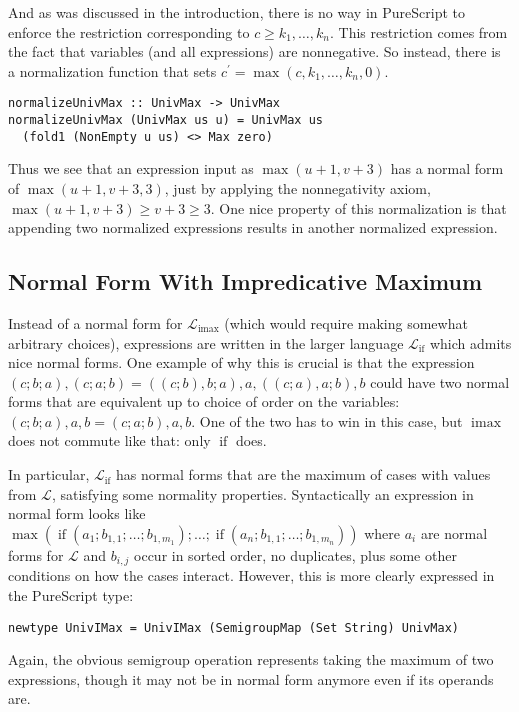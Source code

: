 \documentclass[11pt, twoside, reqno]{book}
\DeclareMathOperator{\imax}{imax}
\DeclareMathOperator{\ifop}{if}
\begin{document}

And as was discussed in the introduction, there is no way in PureScript to enforce the restriction corresponding to \(c \ge k_1, \dots, k_n\).
This restriction comes from the fact that variables (and all expressions) are nonnegative.
So instead, there is a normalization function that sets \(c^\prime = \max(c, k_1, \dots, k_n, 0)\).
\begin{verbatim}
normalizeUnivMax :: UnivMax -> UnivMax
normalizeUnivMax (UnivMax us u) = UnivMax us
  (fold1 (NonEmpty u us) <> Max zero)
\end{verbatim}
Thus we see that an expression input as \(\max(u+1, v+3)\) has a normal form of \(\max(u+1, v+3, 3)\), just by applying the nonnegativity axiom, \(\max(u+1, v+3) \ge v+3 \ge 3\).
One nice property of this normalization is that appending two normalized expressions results in another normalized expression.

\subsection{Normal Form With Impredicative Maximum}

Instead of a normal form for \(\mathcal{L}_{\imax}\) (which would require making somewhat arbitrary choices), expressions are written in the larger language \(\mathcal{L}_{\ifop}\) which admits nice normal forms.
One example of why this is crucial is that the expression \((c; b; a), (c; a; b) = ((c; b), b; a), a, ((c; a), a; b), b\) could have two normal forms that are equivalent up to choice of order on the variables: \((c; b; a), a, b = (c; a; b), a, b\).
One of the two has to win in this case, but \(\imax\) does not commute like that: only \(\ifop\) does.

In particular, \(\mathcal{L}_{\ifop}\) has normal forms that are the maximum of cases with values from \(\mathcal{L}\), satisfying some normality properties.
Syntactically an expression in normal form looks like\\ \(\max(\ifop(a_1; b_{1,1}; \dots; b_{1,m_1}); \dots; \ifop(a_n; b_{1,1}; \dots; b_{1,m_n}))\) where \(a_i\) are normal forms for \(\mathcal{L}\) and \(b_{i,j}\) occur in sorted order, no duplicates, plus some other conditions on how the cases interact.
However, this is more clearly expressed in the PureScript type:
\begin{verbatim}
newtype UnivIMax = UnivIMax (SemigroupMap (Set String) UnivMax)
\end{verbatim}
Again, the obvious semigroup operation represents taking the maximum of two expressions, though it may not be in normal form anymore even if its operands are.
\end{document}

